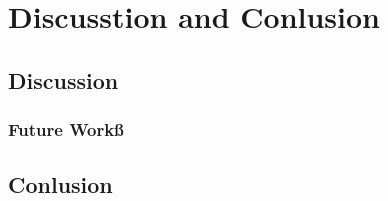 
\chapter{Discusstion and Conlusion}
\section{Discussion}
\subsection{Future Workß}
\section{Conlusion}
\cleardoublepage